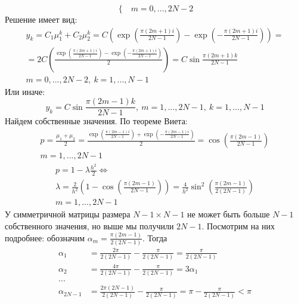 \begin{enumerate}
\begin{enumerate}
\[\begin{cases}
                  \end{cases} m = 0, ...,2N-2\]
                Решение имеет вид:
                \begin{multline*}
                  y_k=C_1\mu_1^k+C_2\mu_2^k=C\left(\exp\left(\frac{\pi(2m+1)i}{2N-1}\right)-\exp\left(-\frac{\pi(2m+1)i}{2N-1}\right)\right)=\\
                  =2C\left(\frac{\exp\left(\frac{\pi(2m+1)i}{2N-1}\right)-\exp\left(-\frac{\pi(2m+1)i}{2N-1}\right)}{2}\right) = C\sin\frac{\pi(2m+1)k}{2N-1}\\
                  m=0,...,2N-2,\ k=1,...,N-1
                \end{multline*}
                Или иначе:
                \[y_k=C\sin\frac{\pi(2m-1)k}{2N-1},\ m=1,...,2N-1,\ k=1,...,N-1\]
                Найдем собственные значения. По теореме Виета:
                \begin{multline*}
                  p=\frac{\mu_1+\mu_2}{2}=\frac{\exp\left(\frac{\pi(2m-1)i}{2N-1}\right) + \exp\left(-\frac{\pi(2m-1)i}{2N-1}\right)}{2}=\cos\left(\frac{\pi(2m-1)}{2N-1}\right)\\
                  m=1,...,2N-1
                \end{multline*}
                \begin{multline*}
                  p=1-\lambda\frac{h^2}{2}\Leftrightarrow\\\lambda=\frac{2}{h^2}\left(1-\cos\left(\frac{\pi(2m-1)}{2N-1}\right)\right)=\frac{4}{h^2}\sin^2\left(\frac{\pi(2m-1)}{2(2N-1)}\right)\\
                  m=1,...,2N-1
                \end{multline*}
                У симметричной матрицы размера $N-1\times N-1$ не может быть больше $N-1$ собственного значения, но выше мы получили $2N-1$.
                Посмотрим на них подробнее: обозначим $\alpha_m=\frac{\pi(2m-1)}{2(2N-1)}$. Тогда
                \begin{align*}
                  \alpha_1      & = \frac{2\pi}{2(2N-1)} - \frac{\pi}{2(2N-1)} = \frac{\pi}{2(2N-1)}                   \\
                  \alpha_2      & = \frac{4\pi}{2(2N-1)} - \frac{\pi}{2(2N-1)} = 3\alpha_1                             \\
                  ...           &                                                                                      \\
                  \alpha_{2N-1} & = \frac{2\pi(2N-1)}{2(2N-1)} - \frac{\pi}{2(2N-1)} = \pi - \frac{\pi}{2(2N-1)} < \pi \\

\end{align*}
\end{enumerate}
\end{enumerate}
